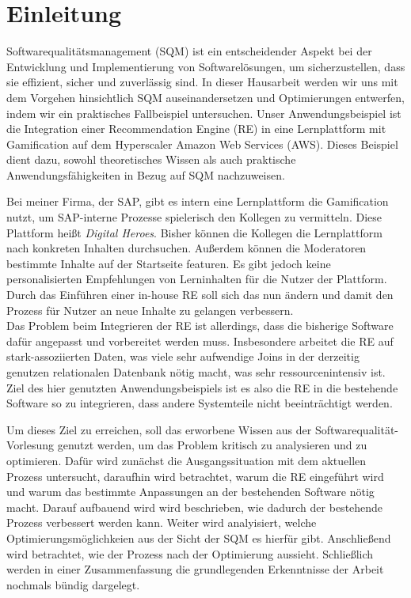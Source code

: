 \chapter{Einleitung}

Softwarequalitätsmanagement (SQM) ist ein entscheidender Aspekt bei der Entwicklung und Implementierung von Softwarelösungen, 
um sicherzustellen, dass sie effizient, sicher und zuverlässig sind. In dieser Hausarbeit werden wir uns mit dem Vorgehen 
hinsichtlich SQM auseinandersetzen und Optimierungen entwerfen, indem wir ein praktisches Fallbeispiel untersuchen. 
Unser Anwendungsbeispiel ist die Integration einer Recommendation Engine (RE) in eine Lernplattform mit Gamification 
auf dem Hyperscaler Amazon Web Services (AWS). Dieses Beispiel dient dazu, sowohl theoretisches Wissen als auch praktische 
Anwendungsfähigkeiten in Bezug auf SQM nachzuweisen.

Bei meiner Firma, der SAP, gibt es intern eine Lernplattform die Gamification nutzt, um SAP-interne Prozesse 
spielerisch den Kollegen zu vermitteln. Diese Plattform heißt \textit{Digital Heroes}. 
Bisher können die Kollegen die Lernplattform nach konkreten Inhalten durchsuchen. 
Außerdem können die Moderatoren bestimmte Inhalte auf der Startseite featuren. Es gibt jedoch keine 
personalisierten Empfehlungen von Lerninhalten für die Nutzer der Plattform. 
Durch das Einführen einer in-house RE soll sich das nun ändern und damit den Prozess für Nutzer an neue Inhalte 
zu gelangen verbessern.  \\
Das Problem beim Integrieren der RE ist allerdings, dass die bisherige Software dafür angepasst 
und vorbereitet werden muss. Insbesondere arbeitet die RE auf stark-assoziierten Daten, 
was viele sehr aufwendige Joins in der derzeitig genutzen relationalen Datenbank nötig macht, 
was sehr ressourcenintensiv ist.  
Ziel des hier genutzten Anwendungsbeispiels ist es also die RE in die bestehende Software so zu integrieren, 
dass andere Systemteile nicht beeinträchtigt werden. 

Um dieses Ziel zu erreichen, soll das erworbene Wissen aus der Softwarequalität-Vorlesung genutzt werden, 
um das Problem kritisch zu analysieren und zu optimieren. 
Dafür wird zunächst die Ausgangssituation mit dem aktuellen Prozess untersucht, 
daraufhin wird betrachtet, warum die RE eingeführt wird und warum das bestimmte Anpassungen an der 
bestehenden Software nötig macht. Darauf aufbauend wird wird beschrieben, wie dadurch der bestehende 
Prozess verbessert werden kann. Weiter wird analyisiert, welche Optimierungsmöglichkeien aus der Sicht 
der SQM es hierfür gibt. Anschließend wird betrachtet, wie der Prozess nach der Optimierung aussieht. 
Schließlich werden in einer Zusammenfassung die grundlegenden Erkenntnisse der Arbeit nochmals bündig dargelegt.
